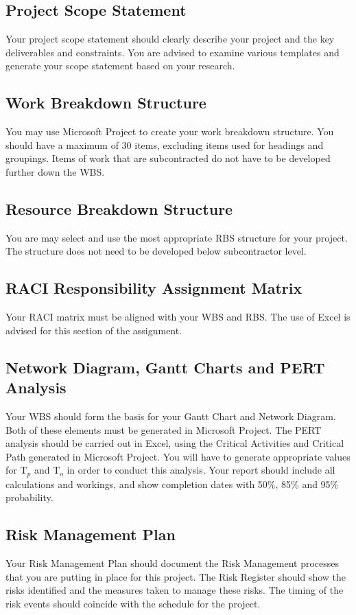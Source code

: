 \subsection*{Project Scope Statement}
Your project scope statement should clearly describe your project and the key deliverables and constraints.  You are advised to examine various templates and generate your scope statement based on your research. 
\subsection*{Work Breakdown Structure}
You may use Microsoft Project to create your work breakdown structure. You should have a maximum of 30 items, excluding items used for headings and groupings.  Items of work that are subcontracted do not have to be developed further down the WBS.
\subsection*{Resource Breakdown Structure}
You are may select and use the most appropriate RBS structure for your project.  The structure does not need to be developed below subcontractor level.
\subsection*{RACI Responsibility Assignment Matrix}
Your RACI matrix must be aligned with your WBS and RBS.  The use of Excel is advised for this section of the assignment. 
\subsection*{Network Diagram, Gantt Charts and PERT Analysis}
Your WBS should form the basis for your Gantt Chart and Network Diagram.  Both of these elements must be generated in Microsoft Project.  The PERT analysis should be carried out in Excel, using the Critical Activities and Critical Path generated in Microsoft Project.  You will have to generate appropriate values for T$_{p}$ and T$_{o}$ in order to conduct this analysis.  Your report should include all calculations and workings, and show completion dates with 50\%, 85\% and 95\% probability.     


\subsection*{Risk Management Plan}
Your Risk Management Plan should document the Risk Management processes that you are putting in place for this project.  The Risk Register should show the risks identified and the measures taken to manage these risks.  The timing of the risk events should coincide with the schedule for the project.


